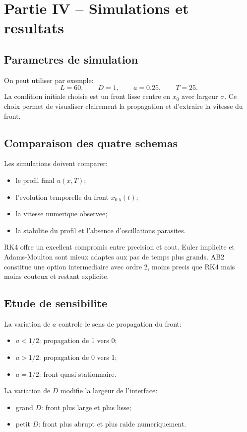 \documentclass[11pt,a4paper]{report}
\begin{document}
\chapter{Partie IV -- Simulations et resultats}
\section{Parametres de simulation}
On peut utiliser par exemple:
\begin{equation}
 L=60, \qquad D=1, \qquad a=0.25, \qquad T=25.
\end{equation}
La condition initiale choisie est un front lisse centre en $x_0$ avec largeur $\sigma$.
Ce choix permet de visualiser clairement la propagation et d'extraire la vitesse du front.

\section{Comparaison des quatre schemas}
Les simulations doivent comparer:
\begin{itemize}[leftmargin=1.5em]
  \item le profil final $u(x,T)$;
  \item l'evolution temporelle du front $x_{0.5}(t)$;
  \item la vitesse numerique observee;
  \item la stabilite du profil et l'absence d'oscillations parasites.
\end{itemize}

RK4 offre un excellent compromis entre precision et cout. Euler implicite et Adams-Moulton sont mieux adaptes
aux pas de temps plus grands. AB2 constitue une option intermediaire avec ordre 2, moins precis que RK4
mais moins couteux et restant explicite.

\section{Etude de sensibilite}
La variation de $a$ controle le sens de propagation du front:
\begin{itemize}[leftmargin=1.5em]
  \item $a<1/2$: propagation de 1 vers 0;
  \item $a>1/2$: propagation de 0 vers 1;
  \item $a=1/2$: front quasi stationnaire.
\end{itemize}

La variation de $D$ modifie la largeur de l'interface:
\begin{itemize}[leftmargin=1.5em]
  \item grand $D$: front plus large et plus lisse;
  \item petit $D$: front plus abrupt et plus raide numeriquement.
\end{itemize}
\end{document}
